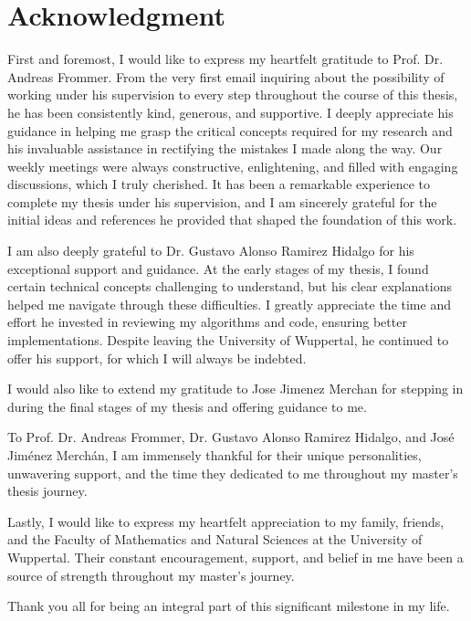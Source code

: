 \section*{Acknowledgment}

First and foremost, I would like to express my heartfelt gratitude to Prof. Dr. Andreas Frommer. From the very first email inquiring about the possibility of working under his supervision to every step throughout the course of this thesis, he has been consistently kind, generous, and supportive. I deeply appreciate his guidance in helping me grasp the critical concepts required for my research and his invaluable assistance in rectifying the mistakes I made along the way. Our weekly meetings were always constructive, enlightening, and filled with engaging discussions, which I truly cherished. It has been a remarkable experience to complete my thesis under his supervision, and I am sincerely grateful for the initial ideas and references he provided that shaped the foundation of this work.

\vspace{10pt}

I am also deeply grateful to Dr. Gustavo Alonso Ramirez Hidalgo for his exceptional support and guidance. At the early stages of my thesis, I found certain technical concepts challenging to understand, but his clear explanations helped me navigate through these difficulties. I greatly appreciate the time and effort he invested in reviewing my algorithms and code, ensuring better implementations. Despite leaving the University of Wuppertal, he continued to offer his support, for which I will always be indebted. 

\vspace{10pt}

I would also like to extend my gratitude to Jose Jimenez Merchan for stepping in during the final stages of my thesis and offering guidance to me.

\vspace{10pt}

To Prof. Dr. Andreas Frommer, Dr. Gustavo Alonso Ramirez Hidalgo, and José Jiménez Merchán, I am immensely thankful for their unique personalities, unwavering support, and the time they dedicated to me throughout my master's thesis journey.

\vspace{10pt}

Lastly, I would like to express my heartfelt appreciation to my family, friends, and the Faculty of Mathematics and Natural Sciences at the University of Wuppertal. Their constant encouragement, support, and belief in me have been a source of strength throughout my master’s journey.

\vspace{20pt}

Thank you all for being an integral part of this significant milestone in my life.
